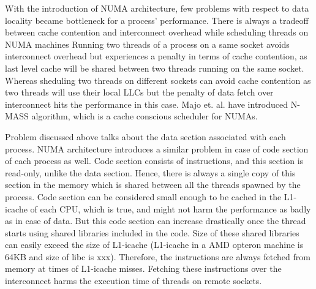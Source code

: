 With the introduction of NUMA architecture, few problems with respect to data locality became bottleneck for a process' performance.
There is always a tradeoff between cache contention and interconnect overhead while scheduling threads on NUMA machines \cite{Majo:2011:MMN:1993478.1993481}
Running two threads of a process on a same socket avoids interconnect overhead but experiences a penalty in terms of cache contention, as last level cache will be shared between two threads running on the same socket.
Whereas sheduling two threads on different sockets can avoid cache contention as two threads will use their local LLCs but the penalty of data fetch over interconnect hits the performance in this case.
Majo et. al. \cite{Majo:2011:MMN:1993478.1993481} have introduced N-MASS algorithm, which is a cache conscious scheduler for NUMAs.

Problem discussed above talks about the data section associated with each process.
NUMA architecture introduces a similar problem in case of code section of each process as well.
Code section consists of instructions, and this section is read-only, unlike the data section.
Hence, there is always a single copy of this section in the memory which is shared between all the threads spawned by the process.
Code section can be considered small enough to be cached in the L1-icache of each CPU, which is true, and might not harm the performance as badly as in case of data.
But this code section can increase drastically once the thread starts using shared libraries included in the code.
Size of these shared libraries can easily exceed the size of L1-icache (L1-icache in a AMD opteron machine is 64KB and size of libc is xxx).
Therefore, the instructions are always fetched from memory at times of L1-icache misses.
Fetching these instructions over the interconnect harms the execution time of threads on remote sockets.


